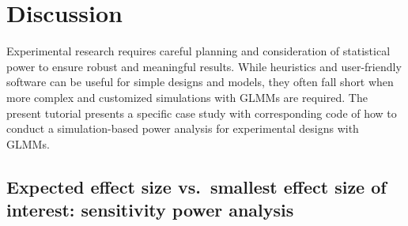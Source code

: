 \documentclass[
  man,floatsintext]{apa6}
\begin{document}
\hypertarget{discussion}{%
\section{Discussion}\label{discussion}}

Experimental research requires careful planning and consideration of statistical power to ensure robust and meaningful results. While heuristics and user-friendly software can be useful for simple designs and models, they often fall short when more complex and customized simulations with GLMMs are required. The present tutorial presents a specific case study with corresponding code of how to conduct a simulation-based power analysis for experimental designs with GLMMs.

\hypertarget{expected-effect-size-vs.-smallest-effect-size-of-interest-sensitivity-power-analysis}{%
\subsection{Expected effect size vs.~smallest effect size of interest: sensitivity power analysis}\label{expected-effect-size-vs.-smallest-effect-size-of-interest-sensitivity-power-analysis}}
\end{document}
